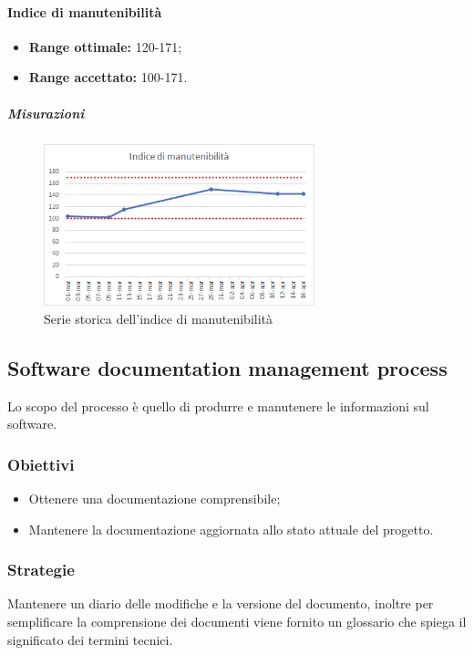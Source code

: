 			\paragraph{Indice di manutenibilità}  \Spazio
			\begin{itemize}
				\item \textbf{Range ottimale:} 120-171;
				\item \textbf{Range accettato:} 100-171.
			\end{itemize}
		    \subparagraph{Misurazioni}
		    \begin{figure}[H]
		    	\centering 
		    	\includegraphics[width=0.7\textwidth]{Images/indicedim.png}
		    	\caption{Serie storica dell'indice di manutenibilità}
		    	\label{indicedim} 
		    \end{figure}

	\subsection{Software documentation management process}
	\label{sub:qdp3}
	
	Lo scopo del processo è quello di produrre e manutenere le informazioni sul software.
		\subsubsection{Obiettivi}
		\begin{itemize}
			\item Ottenere una documentazione comprensibile;
			\item Mantenere la documentazione aggiornata allo stato attuale del progetto.
		\end{itemize}
		\subsubsection{Strategie}
		Mantenere un diario delle modifiche e la versione del documento, inoltre per semplificare la comprensione dei documenti viene fornito un glossario che spiega il significato dei termini tecnici. 
